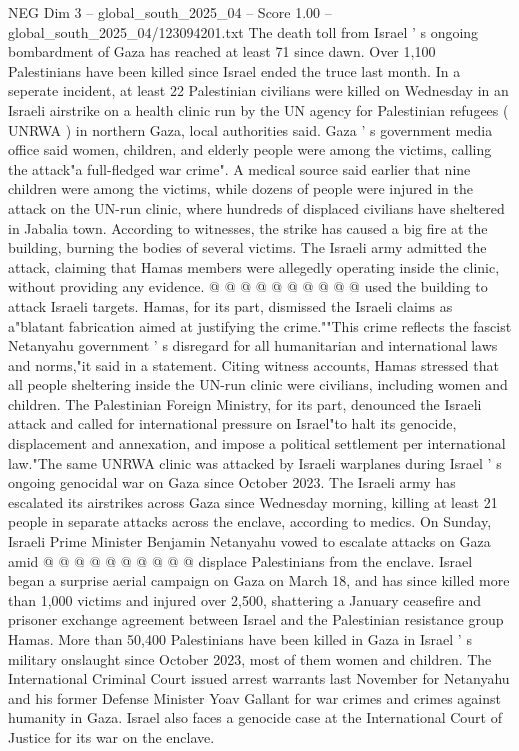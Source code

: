 \begin{textsample}{NEG Dim 3 – global\_south\_2025\_04 – Score 1.00 – global\_south\_2025\_04/123094201.txt}  \label{ex:f3_neg_342}
The death toll from Israel ' s ongoing bombardment of Gaza has reached at least 71 since dawn.
Over 1,100 Palestinians have been killed since Israel ended the truce last month.
In a seperate incident, at least 22 Palestinian civilians were killed on Wednesday in an Israeli airstrike on a health clinic run by the UN agency for Palestinian refugees ( UNRWA ) in northern Gaza, local authorities said.
Gaza ' s government media office said women, children, and elderly people were among the victims, calling the attack"a full-fledged war crime".
A medical source said earlier that nine children were among the victims, while dozens of people were injured in the attack on the UN-run clinic, where hundreds of displaced civilians have sheltered in Jabalia town.
According to witnesses, the strike has caused a big fire at the building, burning the bodies of several victims.
The Israeli army admitted the attack, claiming that Hamas members were allegedly operating inside the clinic, without providing any evidence. @ @ @ @ @ @ @ @ @ @ used the building to attack Israeli targets.
Hamas, for its part, dismissed the Israeli claims as a"blatant fabrication aimed at justifying the crime.""This crime reflects the fascist Netanyahu government ' s disregard for all humanitarian and international laws and norms,"it said in a statement.
Citing witness accounts, Hamas stressed that all people sheltering inside the UN-run clinic were civilians, including women and children.
The Palestinian Foreign Ministry, for its part, denounced the Israeli attack and called for international pressure on Israel"to halt its genocide, displacement and annexation, and impose a political settlement per international law."The same UNRWA clinic was attacked by Israeli warplanes during Israel ' s ongoing genocidal war on Gaza since October 2023.
The Israeli army has escalated its airstrikes across Gaza since Wednesday morning, killing at least 21 people in separate attacks across the enclave, according to medics.
On Sunday, Israeli Prime Minister Benjamin Netanyahu vowed to escalate attacks on Gaza amid @ @ @ @ @ @ @ @ @ @ displace Palestinians from the enclave.
Israel began a surprise aerial campaign on Gaza on March 18, and has since killed more than 1,000 victims and injured over 2,500, shattering a January ceasefire and prisoner exchange agreement between Israel and the Palestinian resistance group Hamas.
More than 50,400 Palestinians have been killed in Gaza in Israel ' s military onslaught since October 2023, most of them women and children.
The International Criminal Court issued arrest warrants last November for Netanyahu and his former Defense Minister Yoav Gallant for war crimes and crimes against humanity in Gaza.
Israel also faces a genocide case at the International Court of Justice for its war on the enclave.

\end{textsample}
